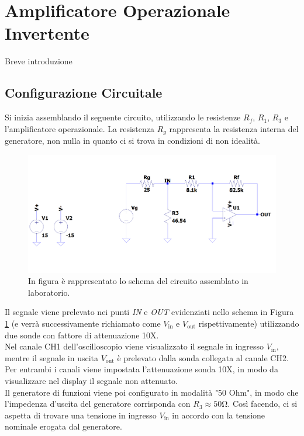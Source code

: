 \documentclass[a4paper,11pt]{article}
\begin{document}
\cleardoublepage




\section{Amplificatore Operazionale Invertente}
Breve introduzione

\subsection{Configurazione Circuitale}

Si inizia assemblando il seguente circuito, utilizzando le resistenze $R_f$, $R_1$, $R_3$ e l'amplificatore
operazionale. La resistenza $R_g$ rappresenta la resistenza interna del generatore, non nulla in quanto ci si trova in
condizioni di non idealità. 

\begin{figure}[H]
	\centering
	\includegraphics[width=\linewidth]{../Simulations/OpAmp/circuit_image_nosim.png}
	\caption{In figura è rappresentato lo schema del circuito assemblato in laboratorio.}
	\label{i:opamp_circuit}
\end{figure}

\noindent Il segnale viene prelevato nei punti \textit{IN} e \textit{OUT} evidenziati nello schema in Figura
\ref{i:opamp_circuit} (e verrà successivamente richiamato come $V_{\text{in}}$ e $V_{\text{out}}$ rispettivamente)
utilizzando due sonde con fattore di attenuazione 10X.\\
\noindent Nel canale CH1 dell'oscilloscopio viene visualizzato il segnale in ingresso $V_{\text{in}}$, mentre il segnale
in uscita $V_{\text{out}}$ è prelevato dalla sonda collegata al canale CH2. Per entrambi i canali viene impostata
l'attenuazione sonda 10X, in modo da visualizzare nel display il segnale non attenuato. \\
\noindent Il generatore di funzioni viene poi configurato in modalità "50 Ohm", in modo che l'impedenza d'uscita del
generatore corrisponda con $R_3\approx 50\si{\ohm}$. Così facendo, ci si aspetta di trovare una tensione in ingresso
$V_{\text{in}}$ in accordo con la tensione nominale erogata dal generatore. 
\end{document}
